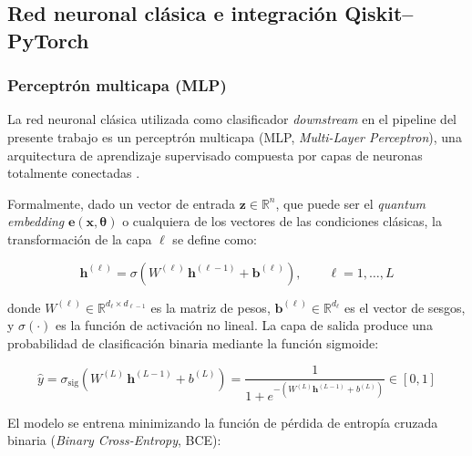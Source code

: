 
\subsection{Red neuronal clásica e integración
            Qiskit--PyTorch}

\subsubsection{Perceptrón multicapa (MLP)}

La red neuronal clásica utilizada como clasificador
\textit{downstream} en el pipeline del presente trabajo es
un perceptrón multicapa (MLP, \textit{Multi-Layer
Perceptron}), una arquitectura de aprendizaje supervisado
compuesta por capas de neuronas totalmente conectadas
\cite{goodfellow2016deep}.

Formalmente, dado un vector de entrada
$\mathbf{z} \in \mathbb{R}^n$, que puede ser el
\textit{quantum embedding}
$\mathbf{e}(\mathbf{x}, \boldsymbol{\theta})$ o cualquiera
de los vectores de las condiciones clásicas, la
transformación de la capa $\ell$ se define como:

\begin{equation}
  \mathbf{h}^{(\ell)} = \sigma\!\left(
  W^{(\ell)}\,\mathbf{h}^{(\ell-1)} + \mathbf{b}^{(\ell)}
  \right), \qquad \ell = 1, \ldots, L
  \label{eq:mlp_layer}
\end{equation}

\noindent donde $W^{(\ell)} \in \mathbb{R}^{d_\ell \times
d_{\ell-1}}$ es la matriz de pesos, $\mathbf{b}^{(\ell)}
\in \mathbb{R}^{d_\ell}$ es el vector de sesgos, y
$\sigma(\cdot)$ es la función de activación no lineal.
La capa de salida produce una probabilidad de clasificación
binaria mediante la función sigmoide:

\begin{equation}
  \hat{y} = \sigma_{\text{sig}}\!\left(
  W^{(L)}\,\mathbf{h}^{(L-1)} + b^{(L)}
  \right) =
  \frac{1}{1 + e^{-(W^{(L)}\mathbf{h}^{(L-1)}
  + b^{(L)})}}
  \in [0, 1]
  \label{eq:sigmoid_output}
\end{equation}

\noindent El modelo se entrena minimizando la función de
pérdida de entropía cruzada binaria (\textit{Binary
Cross-Entropy}, BCE):

